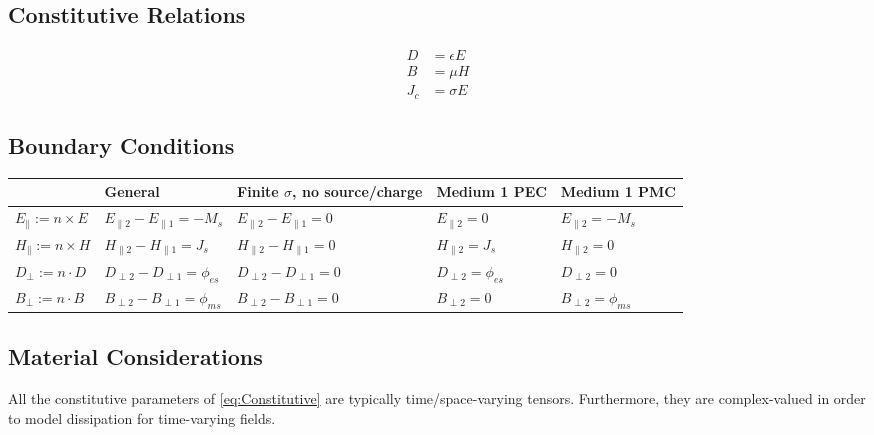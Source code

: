 \documentclass{article}
\begin{document}
\subsection{Constitutive Relations} 
    \begin{subequations}\label{eq:Constitutive}
        \begin{align}
            D &= \epsilon E \label{eq:ConstitutiveElectric} \\ 
            B &= \mu H \label{eq:ConstitutiveMagnetic} \\
            J_c &= \sigma E \label{eq:ConstitutiveCurrentDensity}
        \end{align}
    \end{subequations}
\subsection{Boundary Conditions}

\scriptsize
\begin{tabular}{ | m{6.5em} || m{7.9em} | m{7.5em} | m{7.7em} | m{7.9em} | }
    \hline
    & \textbf{General} & \textbf{Finite \( \sigma \), no source/charge} & \textbf{Medium 1 PEC} & \textbf{Medium 1 PMC} \\
    \hline\hline
    \( E_{\parallel} := n \times E \) & \( E_{\parallel 2} - E_{\parallel 1} = -M_s \) & \( E_{\parallel 2} - E_{\parallel 1} = 0 \) & \( E_{\parallel 2} = 0 \) & \( E_{\parallel 2} = -M_s \) \\
    \( H_{\parallel} := n \times H \) & \( H_{\parallel 2} - H_{\parallel 1} = J_s \) & \( H_{\parallel 2} - H_{\parallel 1} = 0 \) & \( H_{\parallel 2} = J_s \) & \( H_{\parallel 2} = 0 \) \\
    \( D_{\perp} := n \cdot D \) & \( D_{\perp 2} - D_{\perp 1} = \phi_{es} \) & \( D_{\perp 2} - D_{\perp 1} = 0 \) & \( D_{\perp 2} = \phi_{es} \) & \( D_{\perp 2} = 0 \) \\
    \( B_{\perp} := n \cdot B \) & \( B_{\perp 2} - B_{\perp 1} = \phi_{ms} \) & \( B_{\perp 2} - B_{\perp 1} = 0 \) & \( B_{\perp 2} = 0 \) & \( B_{\perp 2} = \phi_{ms} \) \\
    \hline
\end{tabular}
\newpage
\normalsize
\subsection{Material Considerations}
All the constitutive parameters of \eqref{eq:Constitutive} are typically time/space-varying tensors. Furthermore, they are complex-valued in order to model dissipation for time-varying fields.
\end{document}
